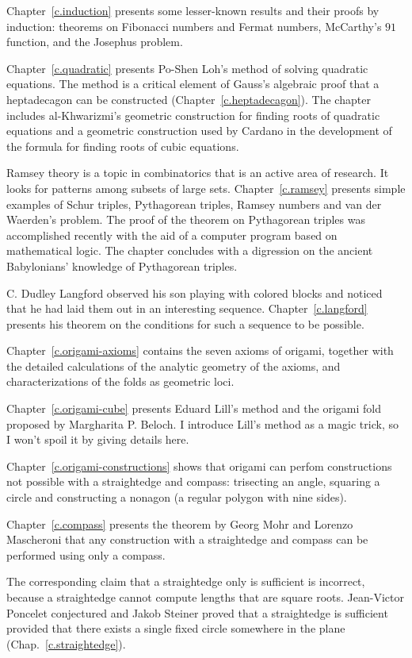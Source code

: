 Chapter~\ref{c.induction} presents some lesser-known results and their proofs by induction: theorems on Fibonacci numbers and Fermat numbers, McCarthy's $91$ function, and the Josephus problem.

Chapter~\ref{c.quadratic} presents Po-Shen Loh's method of solving quadratic equations. The method is a critical element of Gauss's algebraic proof that a heptadecagon can be constructed (Chapter~\ref{c.heptadecagon}). The chapter includes al-Khwarizmi's geometric construction for finding roots of quadratic equations and a geometric construction used by Cardano in the development of the formula for finding roots of cubic equations.

Ramsey theory is a topic in combinatorics that is an active area of research. It looks for patterns among subsets of large sets. Chapter~\ref{c.ramsey} presents simple examples of Schur triples, Pythagorean triples, Ramsey numbers and van der Waerden's problem. The proof of the theorem on Pythagorean triples was accomplished recently with the aid of a computer program based on mathematical logic. The chapter concludes with a digression on the ancient Babylonians' knowledge of Pythagorean triples.

C. Dudley Langford observed his son playing with colored blocks and noticed that he had laid them out in an interesting sequence. Chapter~\ref{c.langford} presents his theorem on the conditions for such a sequence to be possible.

Chapter~\ref{c.origami-axioms} contains the seven axioms of origami, together with the detailed calculations of the analytic geometry of the axioms, and characterizations of the folds as geometric loci.

Chapter~\ref{c.origami-cube} presents Eduard Lill's method and the origami fold proposed by Margharita P. Beloch. I introduce Lill's method as a magic trick, so I won't spoil it by giving details here.

Chapter~\ref{c.origami-constructions} shows that origami can perfom constructions not possible with a straightedge and compass: trisecting an angle, squaring a circle and constructing a nonagon (a regular polygon with nine sides).

Chapter~\ref{c.compass} presents the theorem by Georg Mohr and Lorenzo Mascheroni that any construction with a straightedge and compass can be performed using only a compass.

The corresponding claim that a straightedge only is sufficient is  incorrect, because a straightedge cannot compute lengths that are square roots. Jean-Victor Poncelet conjectured and Jakob Steiner proved that a straightedge is sufficient provided that there exists a single fixed circle somewhere in the plane (Chap.~\ref{c.straightedge}).

